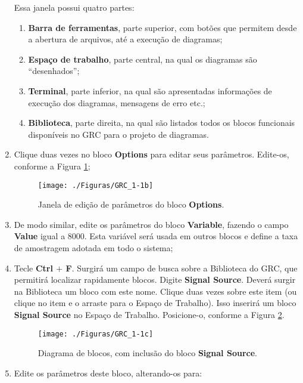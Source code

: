 \documentclass[12pt,addpoints]{exam}
\newcommand{\myscale}{0.4}
\begin{document}
\begin{enumerate}
    Essa janela possui quatro partes:
    \begin{enumerate}
        \item \textbf{Barra de ferramentas}, parte superior, com botões que permitem desde a abertura de arquivos, até a execução de diagramas;
        \item \textbf{Espaço de trabalho}, parte central, na qual os diagramas são ``desenhados'';
        \item \textbf{Terminal}, parte inferior, na qual são apresentadas informações de execução dos diagramas, mensagens de erro etc.;
        \item \textbf{Biblioteca}, parte direita, na qual são listados todos os blocos funcionais disponíveis no GRC para o projeto de diagramas.
    \end{enumerate}
    \item Clique duas vezes no bloco \textbf{Options} para editar seus parâmetros. Edite-os, conforme a Figura \ref{fig:GRC_1-1b};
    \begin{figure}[htb]
        \centering
        \texttt{[image: ./Figuras/GRC\_1-1b]} \\
        \caption{Janela de edição de parâmetros do bloco \textbf{Options}.}
        \label{fig:GRC_1-1b}
    \end{figure}
    \item De modo similar, edite os parâmetros do bloco \textbf{Variable}, fazendo o campo \textbf{Value} igual a 8000. Esta variável será usada em outros blocos e define a taxa de amostragem adotada em todo o sistema;
    \item Tecle \textbf{Ctrl $+$ F}. Surgirá um campo de busca sobre a Biblioteca do GRC, que permitirá localizar rapidamente blocos. Digite \textbf{Signal Source}. Deverá surgir na Biblioteca um bloco com este nome. Clique duas vezes sobre este item (ou clique no item e o arraste para o Espaço de Trabalho). Isso inserirá um bloco \textbf{Signal Source} no Espaço de Trabalho. Posicione-o, conforme a Figura \ref{fig:GRC_1-1c}.
    \begin{figure}[htb]
        \centering
        \texttt{[image: ./Figuras/GRC\_1-1c]} \\
        \caption{Diagrama de blocos, com inclusão do bloco \textbf{Signal Source}.}
        \label{fig:GRC_1-1c}
    \end{figure}
    \item Edite os parâmetros deste bloco, alterando-os para:
    \begin{itemize}

\end{itemize}
\end{enumerate}
\end{document}
